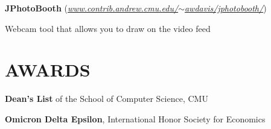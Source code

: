 \documentclass[margin, 11pt]{res} %
\begin{document}
\begin{resume}
\vspace{3pt}
{\bf JPhotoBooth} (\href{www.contrib.andrew.cmu.edu/~awdavis/jphotobooth/}{\sl www.contrib.andrew.cmu.edu/$\sim$awdavis/jphotobooth/})
\begin{itemize} \itemsep -2pt
{\small \item Webcam tool that allows you to draw on the video feed}
\end{itemize}



\section{AWARDS}

{\bf Dean's List} of the School of Computer Science, CMU

\vspace{3pt}

{\bf Omicron Delta Epsilon}, International Honor Society for Economics


\end{resume}
\end{document}
